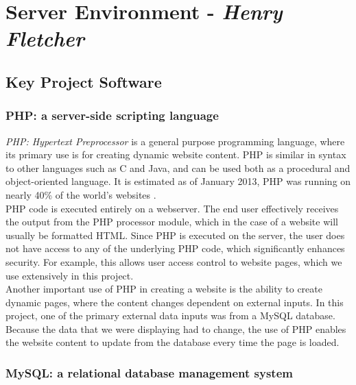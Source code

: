 \documentclass[11pt]{article}
\begin{document}
\clearpage

\section{Server Environment - \textit{Henry Fletcher}}
\subsection{Key Project Software}

\subsubsection{PHP: a server-side scripting language}

\textit{PHP: Hypertext Preprocessor} is a general purpose programming language, where its primary use is for creating dynamic website content. PHP is similar in syntax to other languages such as C and Java, and can be used both as a procedural and object-oriented language. It is estimated as of January 2013, PHP was running on nearly 40\% of the world's websites \cite{netcraft:PHP}.
\\ \indent
PHP code is executed entirely on a webserver. The end user effectively receives the output from the PHP processor module, which in the case of a website will usually be formatted HTML. Since PHP is executed on the server, the user does not have access to any of the underlying PHP code, which significantly enhances security. For example, this allows user access control to website pages, which we use extensively in this project.
\\ \indent
Another important use of PHP in creating a website is the ability to create dynamic pages, where the content changes dependent on external inputs. In this project, one of the primary external data inputs was from a MySQL database. Because the data that we were displaying had to change, the use of PHP enables the website content to update from the database every time the page is loaded.

\subsubsection{MySQL: a relational database management system} \label{mysql}
\end{document}
